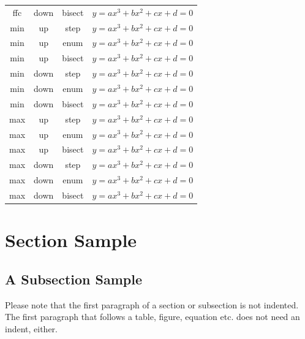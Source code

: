 \documentclass[runningheads]{llncs}
\begin{document}
\begin{table}
\begin{tabularx}{\textwidth}{|C|C|C|C|C|}
        ffc      & down & bisect &  \\
        min      & up   & step   &  \\
        min      & up   & enum   &  \\
        min      & up   & bisect &  \\
        min      & down & step   &  \\
        min      & down & enum   &  \\
        min      & down & bisect &  \\
        max      & up   & step   &  \\
        max      & up   & enum   &  \\
        max      & up   & bisect &  \\
        max      & down & step   &  \\
        max      & down & enum   &  \\
        max      & down & bisect &  \\
        \hline
    \end{tabularx}
\end{table}


\section{Section Sample}
\subsection{A Subsection Sample}
Please note that the first paragraph of a section or subsection is
not indented. The first paragraph that follows a table, figure,
equation etc. does not need an indent, either.
\end{document}
